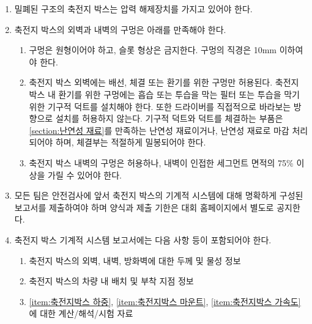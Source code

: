 \documentclass[final,a4paper,10pt]{report}
\begin{document}
\begin{enumerate}

  \item\label{rule:formula-technical.accumulator-container-mechanical.sealed-box-pressure-relief} 밀폐된 구조의 축전지 박스는 압력 해제장치를 가지고 있어야 한다.

  \item\label{rule:formula-technical.accumulator-container-mechanical.wall-holes} 축전지 박스의 외벽과 내벽의 구멍은 아래를 만족해야 한다.
    \begin{enumerate}
      \item\label{rule:formula-technical.accumulator-container-mechanical.wall-holes.circular-max-10mm} 구멍은 원형이어야 하고, 슬롯 형상은 금지한다. 구멍의 직경은 10mm 이하여야 한다.
      \item\label{rule:formula-technical.accumulator-container-mechanical.wall-holes.vent-filter-and-sealing} 축전지 박스 외벽에는 배선, 체결 또는 환기를 위한 구멍만 허용된다. 축전지 박스 내 환기를 위한 구멍에는 흡습 또는 투습을 막는 필터 또는 투습을 막기 위한 기구적 덕트를 설치해야 한다. 또한 드라이버를 직접적으로 바라보는 방향으로 설치를 허용하지 않는다. {\color{blue}기구적 덕트와 덕트를 체결하는 부품은 \ref{section:난연성 재료}를 만족하는 난연성 재료이거나, 난연성 재료로 마감 처리되어야 하며, 체결부는 적절하게 밀봉되어야 한다.}
      \item\label{rule:formula-technical.accumulator-container-mechanical.wall-holes.inner-wall-75pct-coverage} 축전지 박스 내벽의 구멍은 허용하나, 내벽이 인접한 세그먼트 면적의 75\% 이상을 가릴 수 있어야 한다.
    \end{enumerate}

  \item\label{rule:formula-technical.accumulator-container-mechanical.mechanical-report-submission} 모든 팀은 안전검사에 앞서 축전지 박스의 기계적 시스템에 대해 명확하게 구성된 보고서를 제출하여야 하며 양식과 제출 기한은 대회 홈페이지에서 별도로 공지한다.

  \item\label{rule:formula-technical.accumulator-container-mechanical.report-contents} 축전지 박스 기계적 시스템 보고서에는 다음 사항 등이 포함되어야 한다.
    \begin{enumerate}
      \item\label{rule:formula-technical.accumulator-container-mechanical.report-contents.wall-thickness-and-properties} 축전지 박스의 외벽, 내벽, 방화벽에 대한 두께 및 물성 정보
      \item\label{rule:formula-technical.accumulator-container-mechanical.report-contents.placement-and-attachment-info} 축전지 박스의 차량 내 배치 및 부착 지점 정보
      \item\label{rule:formula-technical.accumulator-container-mechanical.report-contents.calculation-analysis-test-data} \ref{item:축전지박스 하중}, \ref{item:축전지박스 마운트}, \ref{item:축전지박스 가속도}에 대한 계산/해석/시험 자료
    \end{enumerate}


\end{enumerate}
\end{document}
